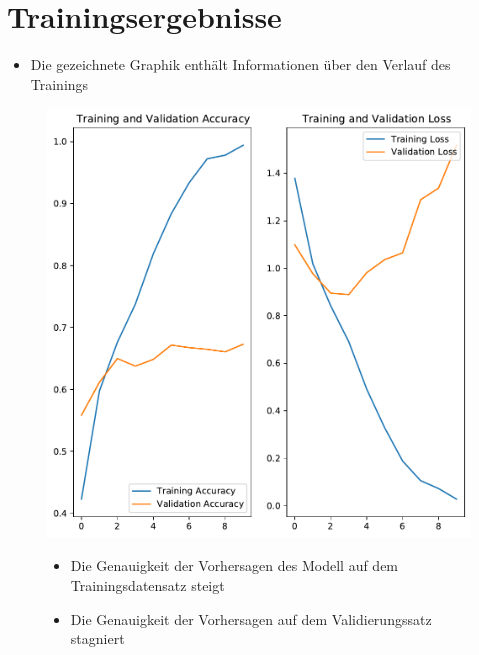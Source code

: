 \documentclass[t]{beamer}
\begin{document}
\section{Trainingsergebnisse}
\begin{frame}
    \begin{itemize}
        \item Die gezeichnete Graphik enthält Informationen über den Verlauf des Trainings
    \end{itemize}
    \begin{figure}
        \begin{minipage}{0.5\textwidth}
            \includegraphics[width=\textwidth]{./teach-plots/pre_augmentation.pdf}
        \end{minipage}\hfill
        \begin{minipage}{0.5\textwidth}
            \begin{itemize}
                \item Die Genauigkeit der Vorhersagen des Modell auf dem Trainingsdatensatz steigt
                \item Die Genauigkeit der Vorhersagen auf dem Validierungssatz stagniert
            \end{itemize}
        \end{minipage}
    \end{figure}
\end{frame}
\end{document}
